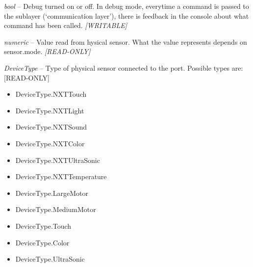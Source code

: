 \documentclass[letterpaper,10pt,english]{sphinxmanual}
\begin{document}
\begin{fulllineitems}
\begin{fulllineitems}
\label{source:source.Sensor.debug}
\emph{bool} -- Debug turned on or off. In debug mode, everytime a command is passed to
the sublayer (`communication layer'), there is feedback in the console about what
command has been called. \emph{{[}WRITABLE{]}}

\end{fulllineitems}


\begin{fulllineitems}
\label{source:source.Sensor.value}
\emph{numeric} -- Value read from hysical sensor. What the value represents depends on
sensor.mode. \emph{{[}READ-ONLY{]}}

\end{fulllineitems}


\begin{fulllineitems}
\label{source:source.Sensor.type}
\emph{DeviceType} -- Type of physical sensor connected to the port. Possible types are: {[}READ-ONLY{]}
\begin{itemize}
\item {} 
DeviceType.NXTTouch

\item {} 
DeviceType.NXTLight

\item {} 
DeviceType.NXTSound

\item {} 
DeviceType.NXTColor

\item {} 
DeviceType.NXTUltraSonic

\item {} 
DeviceType.NXTTemperature

\item {} 
DeviceType.LargeMotor

\item {} 
DeviceType.MediumMotor

\item {} 
DeviceType.Touch

\item {} 
DeviceType.Color

\item {} 
DeviceType.UltraSonic


\end{itemize}
\end{fulllineitems}
\end{fulllineitems}
\end{document}
